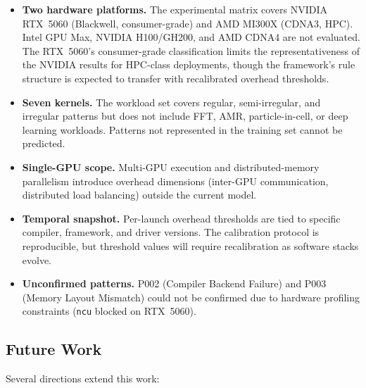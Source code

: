 \begin{itemize}
    \item \textbf{Two hardware platforms.} The experimental matrix covers
    NVIDIA RTX~5060 (Blackwell, consumer-grade) and AMD MI300X (CDNA3, HPC).
    Intel GPU Max, NVIDIA H100/GH200, and AMD CDNA4 are not evaluated.
    The RTX~5060's consumer-grade classification limits the
    representativeness of the NVIDIA results for HPC-class deployments,
    though the framework's rule structure is expected to transfer with
    recalibrated overhead thresholds.

    \item \textbf{Seven kernels.} The workload set covers regular,
    semi-irregular, and irregular patterns but does not include FFT, AMR,
    particle-in-cell, or deep learning workloads. Patterns not represented
    in the training set cannot be predicted.

    \item \textbf{Single-GPU scope.} Multi-GPU execution and
    distributed-memory parallelism introduce overhead dimensions
    (inter-GPU communication, distributed load balancing) outside the
    current model.

    \item \textbf{Temporal snapshot.} Per-launch overhead thresholds are
    tied to specific compiler, framework, and driver versions. The
    calibration protocol is reproducible, but threshold values will require
    recalibration as software stacks evolve.

    \item \textbf{Unconfirmed patterns.} P002 (Compiler Backend Failure)
    and P003 (Memory Layout Mismatch) could not be confirmed due to
    hardware profiling constraints (\texttt{ncu} blocked on RTX~5060).
\end{itemize}

\subsection*{Future Work}

Several directions extend this work:

